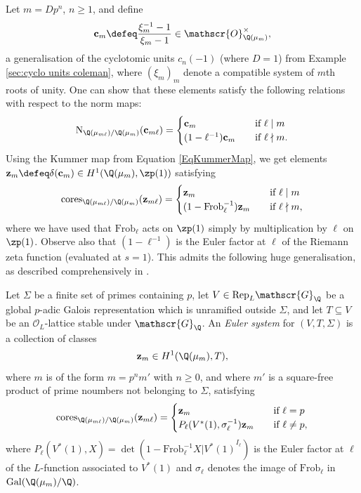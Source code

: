 \documentclass[a4paper,10pt, english, reqno]{smfart}
\numberwithin{equation}{section}
\begin{document}
Let $m = D p^n$, $n \geq 1$, and define
\[ \mathbf{c}_m \defeq \frac{\xi_m^{-1} - 1}{ \xi_m - 1} \in \mathscr{O}_{\Q(\mu_m)}^\times, \]
a generalisation of the cyclotomic units $c_n(-1)$ (where $D=1$) from Example \ref{sec:cyclo units coleman}, where $(\xi_m)_m$ denote a compatible system of $m$th roots of unity. One can show that these elements satisfy the following relations with respect to the norm maps:
\[ \mathrm{N}_{\Q(\mu_{m \ell}) / \Q(\mu_m)}(\mathbf{c}_{m \ell}) =
  \begin{cases}
    \mathbf{c}_{m}       & \quad \text{if } \ell \mid m \\
    (1 - \ell^{-1}) \mathbf{c}_m  & \quad \text{if } \ell \nmid m.
  \end{cases}
\]
Using the Kummer map from Equation \eqref{EqKummerMap}, we get elements $\mathbf{z}_m \defeq \delta(\mathbf{c}_m) \in H^1(\Q(\mu_m), \zp(1))$ satisfying
\[ \mathrm{cores}_{\Q(\mu_{m \ell}) / \Q(\mu_m)}(\mathbf{z}_{m \ell}) =
  \begin{cases}
    \mathbf{z}_{m}       & \quad \text{if } \ell \mid m \\
    (1 - \mathrm{Frob}_\ell^{-1}) \mathbf{z}_m  & \quad \text{if } \ell \nmid m,
  \end{cases}
\]
where we have used that $\mathrm{Frob}_\ell$ acts on $\zp(1)$ simply by multiplication by $\ell$ on $\zp(1)$. Observe also that $(1 - \ell^{-1})$ is the Euler factor at $\ell$ of the Riemann zeta function (evaluated at $s = 1$). This admits the following huge generalisation, as described comprehensively in \cite{Rub00}.

\begin{definition}\label{def:euler systems}
Let $\Sigma$ be a finite set of primes containing $p$, let $V \in \mathrm{Rep}_L \mathscr{G}_\Q$ be a global $p$-adic Galois representation which is unramified outside $\Sigma$, and let $T \subseteq V$ be an $\mathscr{O}_L$-lattice stable under $\mathscr{G}_\Q$. An \emph{Euler system} for $(V, T, \Sigma)$ is a collection of classes
\[ \mathbf{z}_m \in H^1(\Q(\mu_m), T), \]%
where $m$ is of the form $m = p^n m'$ with $n \geq 0$, and where $m'$ is a square-free product of prime noumbers not belonging to $\Sigma$,  satisfying
\[ \mathrm{cores}_{\Q(\mu_{m \ell}) / \Q(\mu_m)}(\mathbf{z}_{m \ell}) =
  \begin{cases}
    \mathbf{z}_{m}       & \quad \text{if } \ell = p \\
    P_\ell(V^*(1), \sigma_\ell^{-1}) \mathbf{z}_m  & \quad \text{if } \ell \neq p,
  \end{cases}
\]
where $P_\ell(V^*(1), X) = \det(1 - \mathrm{Frob}_\ell^{-1} X | {V^*(1)}^{I_\ell})$ is the Euler factor at $\ell$ of the $L$-function associated to $V^*(1)$ and $\sigma_\ell$ denotes the image of $\mathrm{Frob}_\ell$ in $\mathrm{Gal}(\Q(\mu_m) / \Q)$.
\end{definition}
\end{document}
